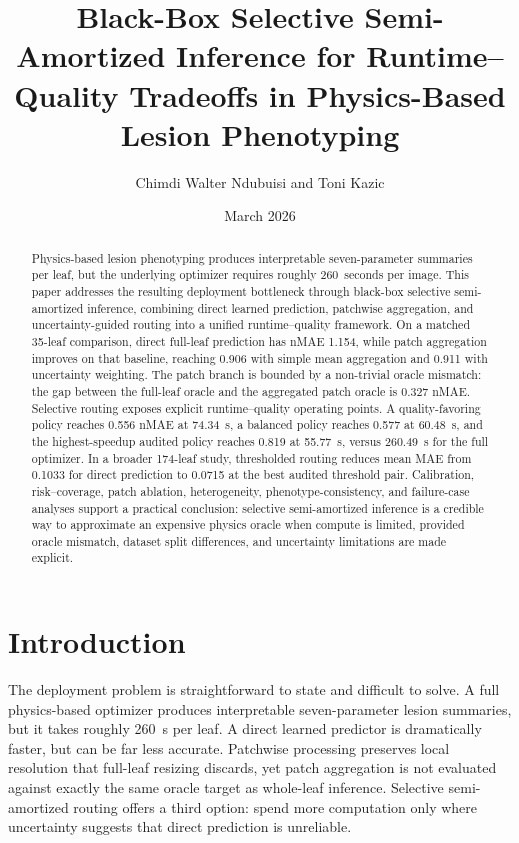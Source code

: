 \documentclass[11pt,a4paper]{article}
\title{Black-Box Selective Semi-Amortized Inference for Runtime--Quality Tradeoffs in Physics-Based Lesion Phenotyping}
\author{Chimdi Walter Ndubuisi and Toni Kazic}
\date{March 2026}
\newcommand{\nmae}{nMAE}
\begin{document}
\maketitle

\begin{abstract}
Physics-based lesion phenotyping produces interpretable seven-parameter summaries per leaf, but the underlying optimizer requires roughly 260~seconds per image.
This paper addresses the resulting deployment bottleneck through black-box selective semi-amortized inference, combining direct learned prediction, patchwise aggregation, and uncertainty-guided routing into a unified runtime--quality framework.
On a matched 35-leaf comparison, direct full-leaf prediction has \nmae{} 1.154, while patch aggregation improves on that baseline, reaching 0.906 with simple mean aggregation and 0.911 with uncertainty weighting.
The patch branch is bounded by a non-trivial oracle mismatch: the gap between the full-leaf oracle and the aggregated patch oracle is 0.327 \nmae{}.
Selective routing exposes explicit runtime--quality operating points.
A quality-favoring policy reaches 0.556 \nmae{} at 74.34~s, a balanced policy reaches 0.577 at 60.48~s, and the highest-speedup audited policy reaches 0.819 at 55.77~s, versus 260.49~s for the full optimizer.
In a broader 174-leaf study, thresholded routing reduces mean MAE from 0.1033 for direct prediction to 0.0715 at the best audited threshold pair.
Calibration, risk--coverage, patch ablation, heterogeneity, phenotype-consistency, and failure-case analyses support a practical conclusion: selective semi-amortized inference is a credible way to approximate an expensive physics oracle when compute is limited, provided oracle mismatch, dataset split differences, and uncertainty limitations are made explicit.
\end{abstract}

\section{Introduction}
The deployment problem is straightforward to state and difficult to solve.
A full physics-based optimizer produces interpretable seven-parameter lesion summaries, but it takes roughly 260~s per leaf.
A direct learned predictor is dramatically faster, but can be far less accurate.
Patchwise processing preserves local resolution that full-leaf resizing discards, yet patch aggregation is not evaluated against exactly the same oracle target as whole-leaf inference.
Selective semi-amortized routing offers a third option: spend more computation only where uncertainty suggests that direct prediction is unreliable.
\end{document}
